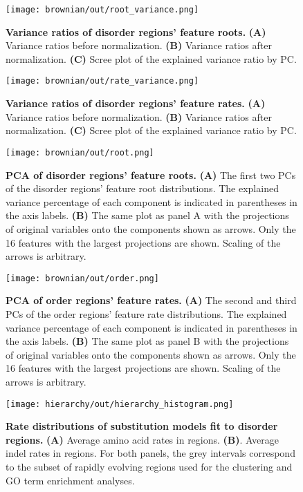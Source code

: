 \begin{figure}[h!]
\texttt{[image: brownian/out/root\_variance.png]}
\centering
\caption{\textbf{Variance ratios of disorder regions' feature roots.}
\textbf{(A)} Variance ratios before normalization.
\textbf{(B)} Variance ratios after normalization.
\textbf{(C)} Scree plot of the explained variance ratio by PC.}
\label{sfig:root_variance}
\end{figure}

\begin{figure}[h!]
\texttt{[image: brownian/out/rate\_variance.png]}
\centering
\caption{\textbf{Variance ratios of disorder regions' feature rates.}
\textbf{(A)} Variance ratios before normalization.
\textbf{(B)} Variance ratios after normalization.
\textbf{(C)} Scree plot of the explained variance ratio by PC.}
\label{sfig:rate_variance}
\end{figure}

\begin{figure}[h!]
\texttt{[image: brownian/out/root.png]}
\centering
\caption{\textbf{PCA of disorder regions' feature roots.}
\textbf{(A)} The first two PCs of the disorder regions' feature root distributions. The explained variance percentage of each component is indicated in parentheses in the axis labels.
\textbf{(B)} The same plot as panel A with the projections of original variables onto the components shown as arrows. Only the 16 features with the largest projections are shown. Scaling of the arrows is arbitrary.}
\label{sfig:root}
\end{figure}

\begin{figure}[h!]
\texttt{[image: brownian/out/order.png]}
\centering
\caption{\textbf{PCA of order regions' feature rates.}
\textbf{(A)} The second and third PCs of the order regions' feature rate distributions. The explained variance percentage of each component is indicated in parentheses in the axis labels.
\textbf{(B)} The same plot as panel B with the projections of original variables onto the components shown as arrows. Only the 16 features with the largest projections are shown. Scaling of the arrows is arbitrary.}
\label{sfig:order}
\end{figure}

\begin{figure}[h!]
\texttt{[image: hierarchy/out/hierarchy\_histogram.png]}
\centering
\caption{\textbf{Rate distributions of substitution models fit to disorder regions.}
\textbf{(A)} Average amino acid rates in regions.
\textbf{(B)}. Average indel rates in regions. For both panels, the grey intervals correspond to the subset of rapidly evolving regions used for the clustering and GO term enrichment analyses.}
\label{sfig:hierarchy_histogram}
\end{figure}

